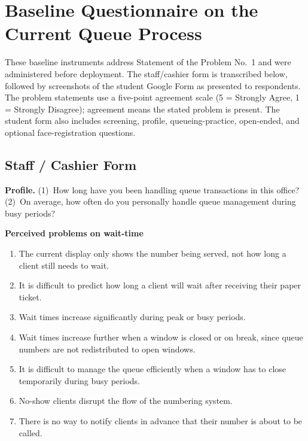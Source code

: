 \documentclass{research}
\begin{document}
\clearpage
\chapter{Baseline Questionnaire on the Current Queue Process}
\label{app:sop1-questionnaire}

These baseline instruments address Statement of the Problem No.~1 and
were administered before deployment. The staff/cashier form is
transcribed below, followed by screenshots of the student Google Form
as presented to respondents. The problem statements use a five-point
agreement scale (5 = Strongly Agree, 1 = Strongly Disagree); agreement
means the stated problem is present. The student form also includes
screening, profile, queueing-practice, open-ended, and optional
face-registration questions.

\section*{Staff / Cashier Form}

\noindent\textbf{Profile.} (1)~How long have you been handling queue
transactions in this office? (2)~On average, how often do you
personally handle queue management during busy periods?

\medskip
\noindent\textbf{Perceived problems on wait-time}
\begin{enumerate}
  \item The current display only shows the number being served, not how
        long a client still needs to wait.
  \item It is difficult to predict how long a client will wait after
        receiving their paper ticket.
  \item Wait times increase significantly during peak or busy periods.
  \item Wait times increase further when a window is closed or on break,
        since queue numbers are not redistributed to open windows.
  \item It is difficult to manage the queue efficiently when a window
        has to close temporarily during busy periods.
  \item No-show clients disrupt the flow of the numbering system.
  \item There is no way to notify clients in advance that their number
        is about to be called.
\end{enumerate}
\end{document}
